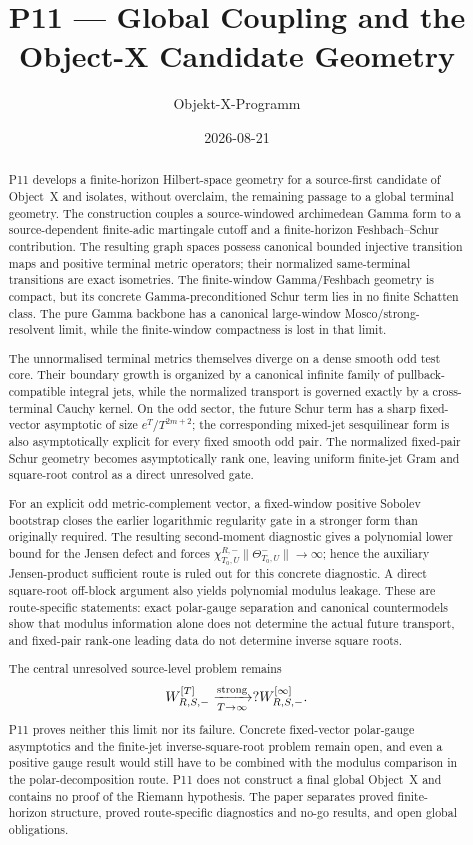 \documentclass[11pt,a4paper]{amsart}
\title[P11 --- Global Coupling]{P11 --- Global Coupling and the Object-X Candidate Geometry}
\author{Objekt-X-Programm}
\date{2026-08-21}
\begin{document}
\begin{abstract}
P11 develops a finite-horizon Hilbert-space geometry for a source-first candidate of
Object~X and isolates, without overclaim, the remaining passage to a global terminal
geometry.  The construction couples a source-windowed archimedean Gamma form to a
source-dependent finite-adic martingale cutoff and a finite-horizon Feshbach--Schur
contribution.  The resulting graph spaces possess canonical bounded injective
transition maps and positive terminal metric operators; their normalized same-terminal
transitions are exact isometries.  The finite-window Gamma/Feshbach geometry is compact,
but its concrete Gamma-preconditioned Schur term lies in no finite Schatten class.  The
pure Gamma backbone has a canonical large-window Mosco/strong-resolvent limit, while the
finite-window compactness is lost in that limit.

The unnormalised terminal metrics themselves diverge on a dense smooth odd test core.
Their boundary growth is organized by a canonical infinite family of pullback-compatible
integral jets, while the normalized transport is governed exactly by a cross-terminal
Cauchy kernel.  On the odd sector, the future Schur term has a sharp fixed-vector
asymptotic of size $e^T/T^{2m+2}$; the corresponding mixed-jet sesquilinear form is also
asymptotically explicit for every fixed smooth odd pair.  The normalized fixed-pair
Schur geometry becomes asymptotically rank one, leaving uniform finite-jet Gram and
square-root control as a direct unresolved gate.

For an explicit odd metric-complement vector, a fixed-window positive Sobolev bootstrap
closes the earlier logarithmic regularity gate in a stronger form than originally
required.  The resulting second-moment diagnostic gives a polynomial lower bound for
the Jensen defect and forces
$\chi_{T_0,U}^{R,-}\|\Theta_{T_0,U}^-\|\to\infty$; hence the auxiliary
Jensen-product sufficient route is ruled out for this concrete diagnostic.  A direct
square-root off-block argument also yields polynomial modulus leakage.  These are
route-specific statements: exact polar-gauge separation and canonical countermodels
show that modulus information alone does not determine the actual future transport,
and fixed-pair rank-one leading data do not determine inverse square roots.

The central unresolved source-level problem remains
\[
 W_{R,S,-}^{[T]}\xrightarrow[T\to\infty]{\rm strong}?W_{R,S,-}^{[\infty]}.
\]
P11 proves neither this limit nor its failure.  Concrete fixed-vector polar-gauge
asymptotics and the finite-jet inverse-square-root problem remain open, and even a
positive gauge result would still have to be combined with the modulus comparison in
the polar-decomposition route.  P11 does not construct a final global Object~X and
contains no proof of the Riemann hypothesis.  The paper separates proved finite-horizon
structure, proved route-specific diagnostics and no-go results, and open global
obligations.
\end{abstract}
\end{document}
